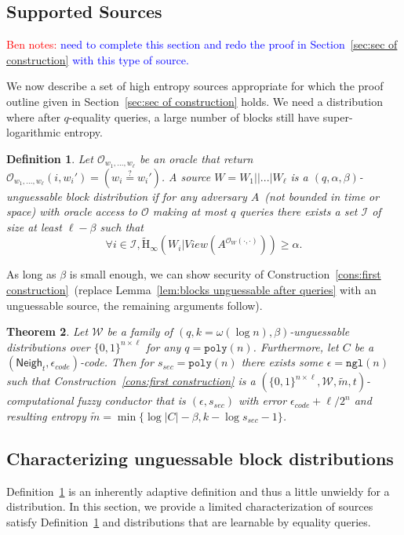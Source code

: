 \documentclass[11pt]{article}
\newcommand{\secref}[1]{\mbox{Section~\ref{#1}}}
\newcommand{\defref}[1]{\mbox{Definition~\ref{#1}}}
\newcommand{\lemref}[1]{\mbox{Lemma~\ref{#1}}}
\newcommand{\consref}[1]{\mbox{Construction~\ref{#1}}}
\newcommand{\class}[1]{{\ensuremath{\mathsf{#1}}}}
\newcommand{\zo}{\ensuremath{\{0, 1\}}}
\newcommand{\neigh}{\ensuremath{\class{Neigh}}\xspace}
\newcommand{\poly}{\ensuremath{\mathtt{poly}}\xspace}
\newcommand{\ngl}{\ensuremath{\mathtt{ngl}}\xspace}
\newcommand{\Hav}{\tilde{\mathrm{H}}_\infty}
\newtheorem{theorem}{Theorem}[section]
\newtheorem{definition}[theorem]{Definition}
\newcommand{\authnote}[2]{{\textcolor{red}{\textsf{#1 notes: }\textcolor{blue}{ #2}}\marginpar{\textcolor{red}{\textbf{!!!!!}}}}}
\newcommand{\authnote}[2]{}
\newcommand{\bnote}[1]{{\authnote{Ben}{#1}}}
\begin{document}
\subsection{Supported Sources}
\label{sec:supported sources}
\bnote{need to complete this section and redo the proof in  \secref{sec:sec of construction} with this type of source.}

We now describe a set of high entropy sources appropriate for which the proof outline given in \secref{sec:sec of construction} holds.  We need a distribution where after $q$-equality queries, a large number of blocks still have super-logarithmic entropy.

\begin{definition}
\label{def:block guessable}
Let $\mathcal{O}_{w_1,..., w_\ell}$ be an oracle that return $\mathcal{O}_{w_1,..., w_\ell}(i, w_i')=\left( w_i\overset{?}=w_i'\right)$.
A source $W = W_1||...|W_\ell$ is a $(q, \alpha, \beta)$-\emph{unguessable block distribution} if for any adversary $A$~(not bounded in time or space) with oracle access to $\mathcal{O}$ making at most $q$ queries there exists a set $\mathcal{I}$ of size at least $\ell -\beta$ such that 
\[
\forall i\in \mathcal{I}, \Hav(W_i |View(A^{\mathcal{O}_{W}(\cdot, \cdot)}))\geq \alpha.
\]
\end{definition}
As long as $\beta$ is small enough, we can show security of \consref{cons:first construction}~(replace \lemref{lem:blocks unguessable after queries} with an unguessable source, the remaining arguments follow).

\begin{theorem}
Let $\mathcal{W}$ be a family of $(q, k= \omega(\log n),  \beta)$-unguessable distributions over $\zo^{n\times \ell}$ for any $q = \poly(n)$.  Furthermore, let $C$ be a $(\neigh_t, \epsilon_{code})$-code.  Then for $s_{sec} = \poly(n)$ there exists some $\epsilon=\ngl(n)$ such that \consref{cons:first construction} is a $(\zo^{n\times \ell}, \mathcal{W}, \tilde{m}, t)$-computational fuzzy conductor that is $(\epsilon, s_{sec})$ with error $\epsilon_{code} + \ell/2^n$ and resulting entropy $\tilde{m} = \min\{\log |C| - \beta, k-\log s_{sec} -1\}$.
\end{theorem}

\subsection{Characterizing unguessable block distributions}

\defref{def:block guessable} is an inherently adaptive definition and thus a little unwieldy for a distribution.  In this section, we provide a limited characterization of sources satisfy \defref{def:block guessable} and distributions that are learnable by equality queries.  
\end{document}

